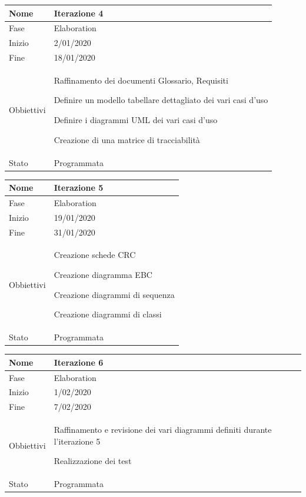 \begin{center}
\begin{tabular}{ |p{2cm}|p{10cm}|  }
\hline
Nome & Iterazione 4 \\\hline
Fase & Elaboration \\\hline
Inizio & 2/01/2020 \\\hline
Fine &  18/01/2020  \\\hline
Obbiettivi & 
	\begin{compactitem}
		\item Raffinamento dei documenti Glossario, Requisiti
		\item Definire un modello tabellare dettagliato dei vari casi d'uso
		\item Definire i diagrammi UML dei vari casi d'uso
		\item Creazione di una matrice di tracciabilità
	\end{compactitem}\\\hline
Stato &  Programmata \\\hline
\end{tabular}
\label{table:4}\newline

\begin{tabular}{ |p{2cm}|p{10cm}|  }
\hline
Nome & Iterazione 5 \\\hline
Fase & Elaboration \\\hline
Inizio & 19/01/2020 \\\hline
Fine &  31/01/2020  \\\hline
Obbiettivi & 
	\begin{compactitem}
		\item Creazione schede CRC
		\item Creazione diagramma EBC
		\item Creazione diagrammi di sequenza
		\item Creazione diagrammi di classi
	\end{compactitem}\\\hline
Stato &  Programmata \\\hline
\end{tabular}
\label{table:5}\newline

\begin{tabular}{ |p{2cm}|p{10cm}|  }
\hline
Nome & Iterazione 6 \\\hline
Fase & Elaboration \\\hline
Inizio & 1/02/2020 \\\hline
Fine & 7/02/2020 \\\hline
Obbiettivi & 
	\begin{compactitem}
		\item Raffinamento e revisione dei vari diagrammi definiti durante l'iterazione 5
		\item Realizzazione dei test
	\end{compactitem}\\\hline
Stato &  Programmata \\\hline
\end{tabular}
\label{table:6}\newline


\end{center}
